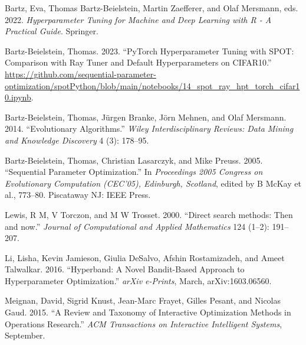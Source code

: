 \documentclass[
  letterpaper,
  DIV=11,
  numbers=noendperiod]{scrreprt}
\newlength{\cslhangindent}
\newlength{\cslentryspacingunit} %
\newenvironment{CSLReferences}[2] %
 {%
  \setlength{\parindent}{0pt}
  \ifodd #1
  \let\oldpar\par
  \def\par{\hangindent=\cslhangindent\oldpar}
  \fi
  \setlength{\parskip}{#2\cslentryspacingunit}
 }%
 {}
\begin{document}

\hypertarget{refs}{}
\begin{CSLReferences}{1}{0}
\leavevmode{}%
Bartz, Eva, Thomas Bartz-Beielstein, Martin Zaefferer, and Olaf
Mersmann, eds. 2022. \emph{{Hyperparameter Tuning for Machine and Deep
Learning with R - A Practical Guide}}. Springer.

\leavevmode{}%
Bartz-Beielstein, Thomas. 2023. {``{PyTorch} Hyperparameter Tuning with
{SPOT}: Comparison with {Ray Tuner} and Default Hyperparameters on
{CIFAR10}.''}
\url{https://github.com/sequential-parameter-optimization/spotPython/blob/main/notebooks/14_spot_ray_hpt_torch_cifar10.ipynb}.

\leavevmode{}%
Bartz-Beielstein, Thomas, Jürgen Branke, Jörn Mehnen, and Olaf Mersmann.
2014. {``Evolutionary Algorithms.''} \emph{Wiley Interdisciplinary
Reviews: Data Mining and Knowledge Discovery} 4 (3): 178--95.

\leavevmode{}%
Bartz-Beielstein, Thomas, Christian Lasarczyk, and Mike Preuss. 2005.
{``{Sequential Parameter Optimization}.''} In \emph{{Proceedings 2005
Congress on Evolutionary Computation (CEC'05), Edinburgh, Scotland}},
edited by B McKay et al., 773--80. Piscataway NJ: {IEEE Press}.

\leavevmode{}%
Lewis, R M, V Torczon, and M W Trosset. 2000. {``{Direct search methods:
Then and now}.''} \emph{Journal of Computational and Applied
Mathematics} 124 (1--2): 191--207.

\leavevmode{}%
Li, Lisha, Kevin Jamieson, Giulia DeSalvo, Afshin Rostamizadeh, and
Ameet Talwalkar. 2016. {``{Hyperband: A Novel Bandit-Based Approach to
Hyperparameter Optimization}.''} \emph{arXiv e-Prints}, March,
arXiv:1603.06560.

\leavevmode{}%
Meignan, David, Sigrid Knust, Jean-Marc Frayet, Gilles Pesant, and
Nicolas Gaud. 2015. {``{A Review and Taxonomy of Interactive
Optimization Methods in Operations Research}.''} \emph{ACM Transactions
on Interactive Intelligent Systems}, September.

\end{CSLReferences}
\end{document}
